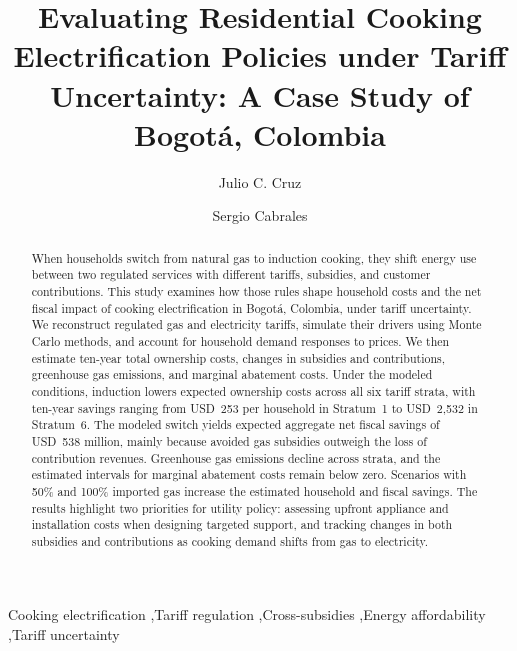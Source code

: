\documentclass[authoryear,preprint,review,10pt]{elsarticle}
\begin{document}
\begin{frontmatter}

\title{Evaluating Residential Cooking Electrification Policies under Tariff Uncertainty: A Case Study of Bogotá, Colombia}

\author[label1]{Julio C. Cruz}
\address[label1]{Department of Industrial Engineering, University of Los Andes,  Cra 1 Este No 19A-40, Bogot\'a, Colombia}

\author[label1]{Sergio Cabrales}

\begin{abstract}
When households switch from natural gas to induction cooking, they shift energy use between two regulated services with different tariffs, subsidies, and customer contributions. This study examines how those rules shape household costs and the net fiscal impact of cooking electrification in Bogotá, Colombia, under tariff uncertainty. We reconstruct regulated gas and electricity tariffs, simulate their drivers using Monte Carlo methods, and account for household demand responses to prices. We then estimate ten-year total ownership costs, changes in subsidies and contributions, greenhouse gas emissions, and marginal abatement costs. Under the modeled conditions, induction lowers expected ownership costs across all six tariff strata, with ten-year savings ranging from USD~253 per household in Stratum~1 to USD~2,532 in Stratum~6. The modeled switch yields expected aggregate net fiscal savings of USD~538 million, mainly because avoided gas subsidies outweigh the loss of contribution revenues. Greenhouse gas emissions decline across strata, and the estimated intervals for marginal abatement costs remain below zero. Scenarios with 50\% and 100\% imported gas increase the estimated household and fiscal savings. The results highlight two priorities for utility policy: assessing upfront appliance and installation costs when designing targeted support, and tracking changes in both subsidies and contributions as cooking demand shifts from gas to electricity.
\end{abstract}


\begin{keyword}
Cooking electrification \sep Tariff regulation \sep Cross-subsidies \sep Energy affordability \sep Tariff uncertainty
\end{keyword}

\end{frontmatter}
\end{document}
